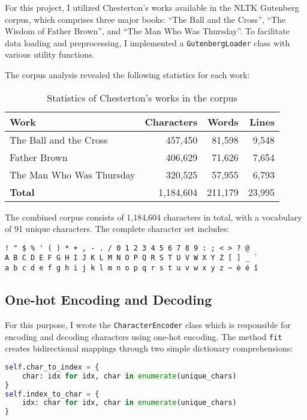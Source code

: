 \documentclass[12pt]{article}
\begin{document}
For this project, I utilized Chesterton's works available in the NLTK Gutenberg corpus, which comprises three major books: ``The Ball and the Cross'', ``The Wisdom of Father Brown'', and ``The Man Who Was Thursday''. To facilitate data loading and preprocessing, I implemented a \texttt{GutenbergLoader} class with various utility functions.

The corpus analysis revealed the following statistics for each work:

\begin{table}[h]
\centering
\begin{tabular}{|l|r|r|r|}
\hline
\textbf{Work} & \textbf{Characters} & \textbf{Words} & \textbf{Lines} \\
\hline
The Ball and the Cross & 457,450 & 81,598 & 9,548 \\
Father Brown & 406,629 & 71,626 & 7,654 \\
The Man Who Was Thursday & 320,525 & 57,955 & 6,793 \\
\hline
\textbf{Total} & 1,184,604 & 211,179 & 23,995 \\
\hline
\end{tabular}
\caption{Statistics of Chesterton's works in the corpus}
\label{tab:corpus-stats}
\end{table}

The combined corpus consists of 1,184,604 characters in total, with a vocabulary of 91 unique characters. The complete character set includes:

\begin{verbatim}
! " $ % ' ( ) * + , - . / 0 1 2 3 4 5 6 7 8 9 : ; < > ? @ 
A B C D E F G H I J K L M N O P Q R S T U V W X Y Z [ ] _ ` 
a b c d e f g h i j k l m n o p q r s t u v w x y z ~ è é î
\end{verbatim}


\subsection{One-hot Encoding and Decoding}

For this purpose, I wrote the \texttt{CharacterEncoder} class which is responsible for encoding and decoding characters using one-hot encoding. The method \texttt{fit} creates bidirectional mappings through two simple dictionary comprehensions:

\begin{lstlisting}[language=Python]
self.char_to_index = {
    char: idx for idx, char in enumerate(unique_chars)
}
self.index_to_char = {
    idx: char for idx, char in enumerate(unique_chars)
}
\end{lstlisting}
\end{document}
